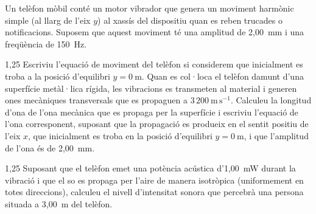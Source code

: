 Un telèfon mòbil conté un motor vibrador que genera un moviment harmònic simple (al llarg de l'eix $y$) al xassís del dispositiu quan es reben trucades o notificacions. Suposem que aquest moviment té una amplitud de 2,00~mm i una freqüència de 150~Hz.

\begin{apartat}{1,25}
Escriviu l'equació de moviment del telèfon si considerem que inicialment es troba a la posició d'equilibri $y = 0\ \mathrm{m}$. Quan es col·loca el telèfon damunt d'una superfície metàl·lica rígida, les vibracions es transmeten al material i generen ones mecàniques transversals que es propaguen a $3\,200\ \mathrm{m\,s^{-1}}$. Calculeu la longitud d'ona de l'ona mecànica que es propaga per la superfície i escriviu l'equació de l'ona corresponent, suposant que la propagació es produeix en el sentit positiu de l'eix $x$, que inicialment es troba en la posició d'equilibri $y = 0\ \mathrm{m}$, i que l'amplitud de l'ona és de 2,00~mm.
\end{apartat}

\begin{apartat}{1,25}
Suposant que el telèfon emet una potència acústica d'1,00~mW durant la vibració i que el so es propaga per l'aire de manera isotròpica (uniformement en totes direccions), calculeu el nivell d'intensitat sonora que percebrà una persona situada a 3,00~m del telèfon.
\end{apartat}

